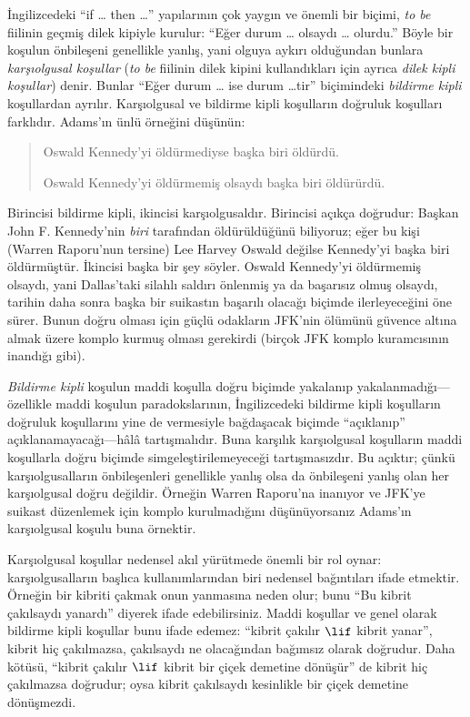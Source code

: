 \documentclass[../../../include/open-logic-section]{subfiles}
\begin{document}


İngilizcedeki ``if \dots{} then \dots'' yapılarının çok yaygın ve önemli bir
biçimi, \emph{to be} fiilinin geçmiş dilek kipiyle kurulur: ``Eğer durum
\dots{} olsaydı \dots{} olurdu.'' Böyle bir koşulun önbileşeni genellikle
yanlış, yani olguya aykırı olduğundan bunlara \emph{karşıolgusal koşullar}
(\emph{to be} fiilinin dilek kipini kullandıkları için ayrıca \emph{dilek
kipli koşullar}) denir. Bunlar ``Eğer durum \dots{} ise durum \dots{}tir''
biçimindeki \emph{bildirme kipli} koşullardan ayrılır. Karşıolgusal ve
bildirme kipli koşulların doğruluk koşulları farklıdır. Adams'ın ünlü
örneğini düşünün:
\begin{quote}
  Oswald Kennedy'yi öldürmediyse başka biri öldürdü.

  Oswald Kennedy'yi öldürmemiş olsaydı başka biri öldürürdü.
\end{quote}
Birincisi bildirme kipli, ikincisi karşıolgusaldır. Birincisi açıkça doğrudur:
Başkan John F. Kennedy'nin \emph{biri} tarafından öldürüldüğünü biliyoruz;
eğer bu kişi (Warren Raporu'nun tersine) Lee Harvey Oswald değilse Kennedy'yi
başka biri öldürmüştür. İkincisi başka bir şey söyler. Oswald Kennedy'yi
öldürmemiş olsaydı, yani Dallas'taki silahlı saldırı önlenmiş ya da başarısız
olmuş olsaydı, tarihin daha sonra başka bir suikastın başarılı olacağı biçimde
ilerleyeceğini öne sürer. Bunun doğru olması için güçlü odakların JFK'nin
ölümünü güvence altına almak üzere komplo kurmuş olması gerekirdi (birçok JFK
komplo kuramcısının inandığı gibi).

\emph{Bildirme kipli} koşulun maddi koşulla doğru biçimde yakalanıp
yakalanmadığı---özellikle maddi koşulun paradokslarının, İngilizcedeki
bildirme kipli koşulların doğruluk koşullarını yine de vermesiyle bağdaşacak
biçimde ``açıklanıp'' açıklanamayacağı---hâlâ tartışmalıdır. Buna karşılık
karşıolgusal koşulların maddi koşullarla doğru biçimde simgeleştirilemeyeceği
tartışmasızdır. Bu açıktır; çünkü karşıolgusalların önbileşenleri genellikle
yanlış olsa da önbileşeni yanlış olan her karşıolgusal doğru değildir. Örneğin
Warren Raporu'na inanıyor ve JFK'ye suikast düzenlemek için komplo
kurulmadığını düşünüyorsanız Adams'ın karşıolgusal koşulu buna örnektir.

Karşıolgusal koşullar nedensel akıl yürütmede önemli bir rol oynar:
karşıolgusalların başlıca kullanımlarından biri nedensel bağıntıları ifade
etmektir. Örneğin bir kibriti çakmak onun yanmasına neden olur; bunu ``Bu
kibrit çakılsaydı yanardı'' diyerek ifade edebilirsiniz. Maddi koşullar ve
genel olarak bildirme kipli koşullar bunu ifade edemez: ``kibrit çakılır
$\lif$ kibrit yanar'', kibrit hiç çakılmazsa, çakılsaydı ne olacağından
bağımsız olarak doğrudur. Daha kötüsü, ``kibrit çakılır $\lif$ kibrit bir
çiçek demetine dönüşür'' de kibrit hiç çakılmazsa doğrudur; oysa kibrit
çakılsaydı kesinlikle bir çiçek demetine dönüşmezdi.
\end{document}
